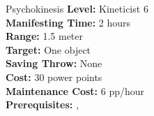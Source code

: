 {Psychokinesis}
{
	\textbf{Level:}
	Kineticist 6\\
	\textbf{Manifesting Time:}
	2 hours\\
	\textbf{Range:}
	1.5 meter\\
	\textbf{Target:}
	One object\\
	\textbf{Saving Throw:}
	None \\
	\textbf{Cost:}
	30 power points\\
	\textbf{Maintenance Cost:}
	6 pp/hour\\
	\textbf{Prerequisites:}
	, \\
}
